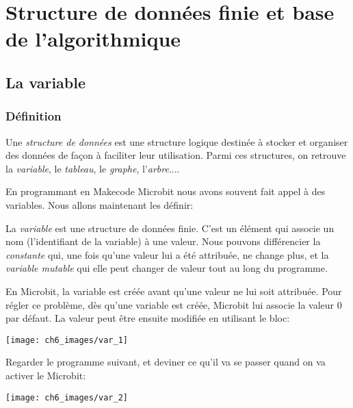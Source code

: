 \documentclass[11pt, a4paper]{book}
\begin{document}
\setcounter{chapter}{5}
\chapter{Structure de données finie et base de l'algorithmique}



\section{La variable}
\subsection{Définition}

\begin{defi}
Une {\it structure de données} est une structure logique destinée à stocker et organiser des données de façon à faciliter leur utilisation. Parmi ces structures, on retrouve la {\it variable}, le {\it tableau}, le {\it graphe}, l'{\it arbre}.... 
\end{defi}

En programmant en Makecode Microbit nous avons souvent fait appel à des variables. Nous allons maintenant les définir:

\begin{defi}
La {\it variable} est une structure de données finie. C'est un élément qui associe un nom (l'identifiant de la variable) à une valeur. Nous pouvons différencier la {\it constante} qui, une fois qu'une valeur lui a été attribuée, ne change plus, et la {\it variable mutable} qui elle peut changer de valeur tout au long du programme.

\end{defi}

\begin{remarque}
En Microbit, la variable est créée avant qu'une valeur ne lui soit attribuée. Pour régler ce problème, dès qu'une variable est créée, Microbit lui associe la valeur 0 par défaut.  La valeur peut être ensuite modifiée en utilisant le bloc:
\begin{center}
\texttt{[image: ch6\_images/var\_1]}
\end{center}
\end{remarque}
	
	
	
\newpage
	
	
	
\begin{exercice}
 Regarder le programme suivant, et deviner ce qu'il va se passer quand on va activer le Microbit:

\begin{center}
\texttt{[image: ch6\_images/var\_2]}
\end{center}
\end{exercice}
\end{document}
